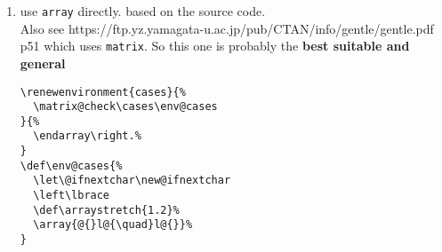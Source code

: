 \documentclass{article}
\begin{document}
\begin{enumerate}
    \item use \verb|array| directly. based on the source code.\\
          Also see https://ftp.yz.yamagata-u.ac.jp/pub/CTAN/info/gentle/gentle.pdf p51 which uses \verb|matrix|. So this one is probably the \textbf{best suitable and general}
          \begin{verbatim}
\renewenvironment{cases}{%
  \matrix@check\cases\env@cases
}{%
  \endarray\right.%
}
\def\env@cases{%
  \let\@ifnextchar\new@ifnextchar
  \left\lbrace
  \def\arraystretch{1.2}%
  \array{@{}l@{\quad}l@{}}%
}
\end{verbatim}


\end{enumerate}
\end{document}
